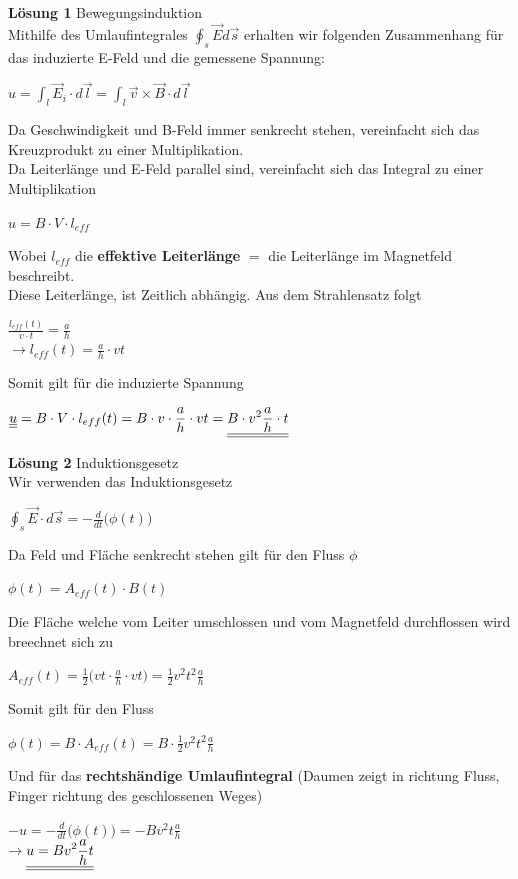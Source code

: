 \beginbsp


\textbf{Lösung 1} Bewegungsinduktion \\
Mithilfe des Umlaufintegrales $\displaystyle \oint_s \vec{E} d\vec{s}$ erhalten wir folgenden Zusammenhang für das induzierte E-Feld und die gemessene Spannung:
\begin{center}
  $ \displaystyle u = \int_l \vec{E}_i \cdot d\vec{l} = \int_l \vec{v} \times \vec{B} \cdot d \vec{l}$
\end{center}
Da Geschwindigkeit und B-Feld immer senkrecht stehen, vereinfacht sich das Kreuzprodukt zu einer Multiplikation. \\
Da Leiterlänge und E-Feld parallel sind, vereinfacht sich das Integral zu einer Multiplikation
\begin{center}
  $\displaystyle u = B \cdot V \cdot l_{eff}$
\end{center}
Wobei $l_{eff}$ die \textbf{effektive Leiterlänge} $=$ die Leiterlänge im Magnetfeld beschreibt. \\
Diese Leiterlänge, ist Zeitlich abhängig. Aus dem Strahlensatz folgt
\begin{center}
  $\frac{l_{eff}(t)}{v \cdot t} = \frac{a}{h}$ \\
  $\rightarrow l_{eff} (t) =  \frac{a}{h} \cdot vt$
\end{center}
Somit gilt für die induzierte Spannung
\begin{center}

    $\displaystyle  \underline{\underline{ u}} = B \cdot V \cdot l_{eff}(t) = B \cdot v \cdot  \frac{a}{h} \cdot vt =  \underline{\underline{ B \cdot v^2 \frac{a}{h} \cdot t}}$
\end{center}

\textbf{Lösung 2} Induktionsgesetz \\
Wir verwenden das Induktionsgesetz
\begin{center}
  $\displaystyle \oint_s \vec{E} \cdot d\vec{s} = - \frac{d}{dt} \big( \phi (t)\big)$
\end{center}
Da Feld und Fläche senkrecht stehen gilt für den Fluss $\phi$
\begin{center}
  $\phi(t) = A_{eff}(t) \cdot B(t)$
\end{center}
Die Fläche welche vom Leiter umschlossen und vom Magnetfeld durchflossen wird breechnet sich zu
\begin{center}
  $A_{eff} (t) = \frac{1}{2} \big ( vt \cdot \frac{a}{h} \cdot vt \big) = \frac{1}{2} v^2t^2 \frac{a}{h}$
\end{center}
Somit gilt für den Fluss
\begin{center}
  $ \phi(t) =  B \cdot A_{eff}(t) = B \cdot \frac{1}{2} v^2t^2 \frac{a}{h}$
\end{center}
Und für das \textbf{rechtshändige Umlaufintegral} (Daumen zeigt in richtung Fluss, Finger richtung des geschlossenen Weges)
\begin{center}
  $ -u = - \frac{d}{dt} \big( \phi(t) \big) = - B v^2 t \frac{a}{h}$ \\
  $ \displaystyle \rightarrow \underline{\underline{ u = B v^2  \frac{a}{h} t }}$
\end{center}
\iend

